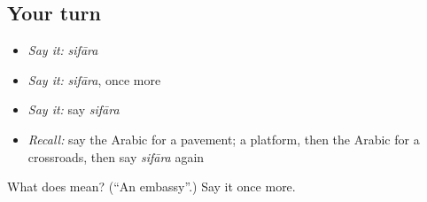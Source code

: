 \subsection*{Your turn}
\begin{itemize}
\raggedright
  \item \emph{Say it:} \emph{sifāra}
  \item \emph{Say it:} \emph{sifāra}, once more
  \item \emph{Say it:} say \emph{sifāra}
  \item \emph{Recall:} say the Arabic for a pavement; a platform, then the Arabic for a crossroads, then say \emph{sifāra} again
\end{itemize}

\begin{tcolorbox}[breakable,colback=teal!4,colframe=teal!35!black,title={Before you move on}]
What does  mean? (\textquotedblleft{}An embassy\textquotedblright{}.) Say it once more.
\end{tcolorbox}
